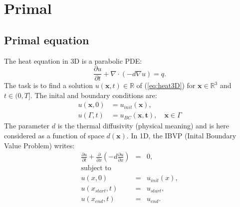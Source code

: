 \section{Primal}
\subsection{Primal equation}
The heat equation in 3D is a parabolic PDE:
\begin{equation}\label{eq:heat3D}
\frac{\partial u}{\partial t} + \nabla\cdot \left(- d\nabla u \right) = q.
\end{equation}
The task is to find a solution $u\left(\mathbf{x}, t\right)\in\mathbb{R}$ of  (\ref{eq:heat3D}) for $\mathbf{x}\in\mathbb{R}^3$ and $t\in(0,T]$. The inital and boundary conditions are:
\begin{align}
u(\mathbf{x},0) & = u_{init}(\mathbf{x}), \\
u(\Gamma,t) & = u_{BC}(\mathbf{x,t}), \quad \mathbf{x}\in\Gamma
\end{align}
The parameter $d$ is the thermal diffusivity (physical meaning) and is here considered as a function of space $d\left(\mathbf{x}\right)$. In 1D, the IBVP (Inital Boundary Value Problem) writes:
\begin{eqnarray}
\frac{\partial u}{\partial t} +\frac{\partial}{\partial x} \left(- d \frac{\partial u}{\partial x}  \right) &=& 0, \\
\text{subject to} \\
u(x,0) &=& u_{init}(x), \\
u(x_{start},t)&=& u_{start}, \\
u(x_{end},t) &=& u_{end}.
\end{eqnarray}
